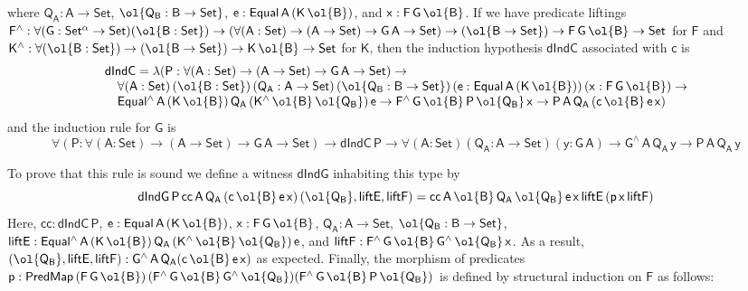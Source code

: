 \documentclass[9pt]{entcs}
\begin{document}
\noindent
where $\mathsf{Q_A : A \to Set}$, $\ol{\mathsf{Q_B : B \to Set}}$,
$\mathsf{e : Equal\,A\,(K\,\ol{B})}$, and $\mathsf{x : F\,G\,\ol{B}}$.
If we have predicate liftings $\mathsf{F^{\wedge}} : \mathsf{\forall
  (G : Set^{\alpha} \to Set) (\ol{B : Set}) \to (\forall (A : Set) \to
  (A \to Set) \to G\,A \to Set) \to (\ol{B \to Set}) \to F\,G\,\ol{B}
  \to Set}$ for $\mathsf{F}$ and $\mathsf{K^{\wedge}} :
\mathsf{\forall (\ol{B : Set}) \to (\ol{B \to Set}) \to K\,\ol{B} \to
  Set}$
for $\mathsf{K}$, then the induction hypothesis $\mathsf{dIndC}$
associated with $\mathsf{c}$ is
\[\begin{array}{l}
\mathsf{dIndC = \lambda (P : \forall (A : Set) \to (A \to Set) \to
  G\,A \to Set) \to}\\
\quad \mathsf{\forall (A : Set)\, (\ol{B : Set})\, (Q_A : A \to Set)\,
  (\ol{Q_B : B \to Set})\, (e : Equal\,A\,(K\,\ol{B}))\, (x :
  F\,G\,\ol{B}) \to} \\ 
\quad \mathsf{
  Equal^{\wedge}\,A\,(K\,\ol{B})\,Q_A\,(K^{\wedge}\,\ol{B}\,\ol{Q_B})\,e
  \to F^{\wedge}\,G\,\ol{B}\,P\,\ol{Q_B}\,x \to
  P\,A\,Q_A\,(c\,\ol{B}\,e\,x)} 
\end{array}\]
and the induction rule for $\mathsf{G}$ is
\begin{equation}\label{eq:gen-ind-rule}
\mathsf{\forall (P : \forall (A : Set) \to (A \to Set) \to G\,A \to
  Set) \to dIndC\,P \to \forall (A : Set)(Q_A : A \to Set)(y : G\,A)
  \to G^{\wedge}\,A\,Q_A\,y \to P\,A\,Q_A\,y}
\end{equation}

To prove that this rule is sound we define a witness
$\mathsf{dIndG}$ inhabiting this type by
\[\mathsf{dIndG\,P\,cc\,A\,Q_A\,(c\,\ol{B}\,e\,x)\,(\ol{Q_B}, liftE, liftF)
= cc\,A\,\ol{B}\,Q_A\,\ol{Q_B}\,e\,x\,liftE\,(p\,x\,liftF)}\] Here,
$\mathsf{cc : dIndC\,P}$, $\mathsf{e : Equal\,A\,(K\,\ol{B})}$,
$\mathsf{x : F\,G\,\ol{B}}$, $\mathsf{Q_A : A \to Set}$,
$\ol{\mathsf{Q_B : B \to Set}}$, $\mathsf{liftE :
  Equal^{\wedge}\,A\,(K\,\ol{B})\,Q_A\,
  (K^{\wedge}\,\ol{B}\,\ol{Q_B})\,e}$, and $\mathsf{liftF :
  F^{\wedge}\,G\,\ol{B}\,G^{\wedge}\,{\ol{Q_B}}\,x}$. As a result,
$\mathsf{(\ol{Q_B}, liftE, liftF) : G^{\wedge}\,A\,Q_A (c\,\ol{B}\,
  e\,x)}$ as expected.  Finally, the morphism of predicates $\mathsf{p
  :
  PredMap\,(F\,G\,\ol{B})\,(F^{\wedge}\,G\,\ol{B}\,G^{\wedge}\,\ol{Q_B})
  (F^{\wedge}\,G\,\ol{B}\,P\,\ol{Q_B})}$ is defined by structural
induction on $\mathsf{F}$ as follows:
\end{document}
